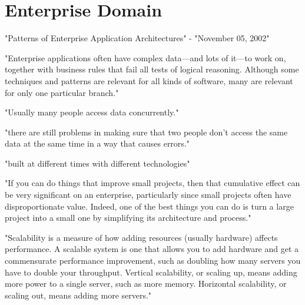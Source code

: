 \chapter{Enterprise Domain}

"Patterns of Enterprise Application Architectures" - "November 05, 2002"

"Enterprise applications often have complex data—and lots of it—to work on, together with business rules that fail all tests of logical reasoning. Although some techniques and patterns are relevant for all kinds of software, many are relevant for only one particular branch."

"Usually many people access data concurrently."

"there are still problems in making sure that two people don't access the same data at the same time in a way that causes errors."

"built at different times with different technologies"

"If you can do things that improve small projects, then that cumulative effect can be very significant on an enterprise, particularly since small projects often have disproportionate value. Indeed, one of the best things you can do is turn a large project into a small one by simplifying its architecture and process."

"Scalability is a measure of how adding resources (usually hardware) affects performance. A scalable system is one that allows you to add hardware and get a commensurate performance improvement, such as doubling how many servers you have to double your throughput. Vertical scalability, or scaling up, means adding more power to a single server, such as more memory. Horizontal scalability, or scaling out, means adding more servers."